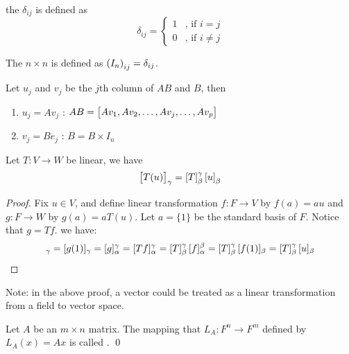 \begin{definition}
	the   $\delta_{ij}$ is defined as 
	\begin{equation}
		\delta_{ij} = \begin{cases}
			1 & \text{, if } i = j \\
			0 & \text{, if } i \neq j
 		\end{cases}
	\end{equation}
\end{definition}

\begin{definition}
	The $n\times n$   is defined as $\mleft(I_n \mright)_{ij} = \delta_{ij}$.
\end{definition}

\begin{theorem}
	Let $u_j$ and $v_j$ be the $j$th column of $AB$ and $B$, then
	\begin{enumerate}
		\item $u_j = A v_j$ : $AB = \coordinate{A v_1, A v_2, \dots, A v_j, \dots, A v_p}$
		\item $v_j = B e_j$ : $B = B \times I_n$
	\end{enumerate}
\end{theorem}

\begin{theorem} Let $T:V \rightarrow W$ be linear, we have
	\begin{equation}
		\coordinate{T(u)}_\gamma = \coordinate{T}_\beta^\gamma \coordinate{u}_\beta
	\end{equation}
\end{theorem}

\begin{proof}
	Fix $u \in V$, and define linear transformation $f: F \rightarrow V$ by $f(a) = a u$ and $g: F \rightarrow W$ by $g(a) = a T(u)$. Let $a=\{1\}$ be the standard basis of $F$. Notice that $g=Tf$. we have:
	\begin{equation}
		[T(u)]_\gamma = [g(1)]_\gamma = [g]_\alpha^\gamma = [Tf]_\alpha^\gamma = \coordinate{T}_\beta^\gamma [f]_\alpha^\beta = \coordinate{T}_\beta^\gamma [f(1)]_\beta = \coordinate{T}_\beta^\gamma [u]_\beta
	\end{equation}
\end{proof}

Note: in the above proof, a vector could be treated as a linear transformation from a field to vector space.

\begin{definition}
	Let $A$ be an $m \times n$ matrix. The mapping  that $L_A: F^n \rightarrow F^m$ defined by $L_A (x) = A x$ is called  . \qed
\end{definition}


